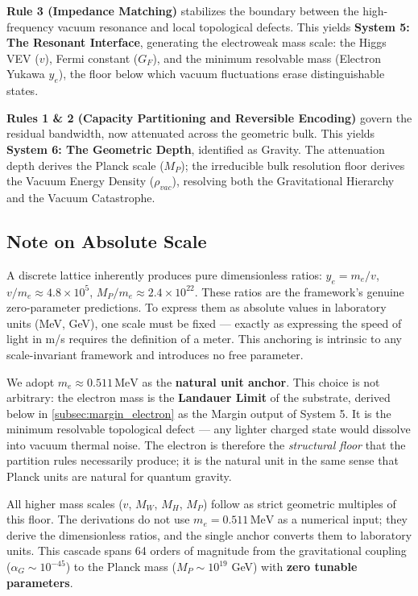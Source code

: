 \textbf{Rule 3 (Impedance Matching)} stabilizes the boundary between the high-frequency vacuum resonance and local topological defects. This yields \textbf{System 5: The Resonant Interface}, generating the electroweak mass scale: the Higgs VEV ($v$), Fermi constant ($G_F$), and the minimum resolvable mass (Electron Yukawa $y_e$), the floor below which vacuum fluctuations erase distinguishable states.

\textbf{Rules 1 \& 2 (Capacity Partitioning and Reversible Encoding)} govern the residual bandwidth, now attenuated across the geometric bulk. This yields \textbf{System 6: The Geometric Depth}, identified as Gravity. The attenuation depth derives the Planck scale ($M_P$); the irreducible bulk resolution floor derives the Vacuum Energy Density ($\rho_{vac}$), resolving both the Gravitational Hierarchy and the Vacuum Catastrophe.

\subsection{Note on Absolute Scale}

A discrete lattice inherently produces pure dimensionless ratios: $y_e = m_e/v$, $v/m_e \approx 4.8 \times 10^5$, $M_P/m_e \approx 2.4 \times 10^{22}$. These ratios are the framework's genuine zero-parameter predictions. To express them as absolute values in laboratory units (MeV, GeV), one scale must be fixed --- exactly as expressing the speed of light in m/s requires the definition of a meter. This anchoring is intrinsic to any scale-invariant framework and introduces no free parameter.

We adopt $m_e \approx 0.511\,\mathrm{MeV}$ as the \textbf{natural unit anchor}. This choice is not arbitrary: the electron mass is the \textbf{Landauer Limit} of the substrate, derived below in \cref{subsec:margin_electron} as the Margin output of System 5. It is the minimum resolvable topological defect --- any lighter charged state would dissolve into vacuum thermal noise. The electron is therefore the \emph{structural floor} that the partition rules necessarily produce; it is the natural unit in the same sense that Planck units are natural for quantum gravity.

All higher mass scales ($v$, $M_W$, $M_H$, $M_P$) follow as strict geometric multiples of this floor. The derivations do not use $m_e = 0.511\,\mathrm{MeV}$ as a numerical input; they derive the dimensionless ratios, and the single anchor converts them to laboratory units. This cascade spans 64 orders of magnitude from the gravitational coupling ($\alpha_G \sim 10^{-45}$) to the Planck mass ($M_P \sim 10^{19}$ GeV) with \textbf{zero tunable parameters}.